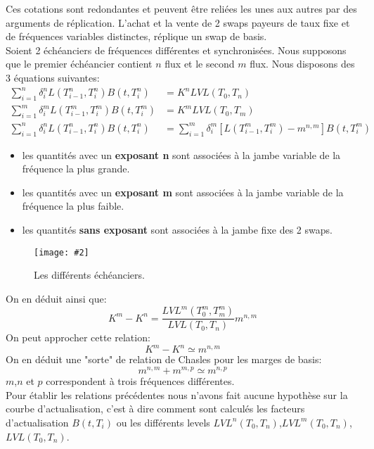 \documentclass{article}
\newcommand{\FIG}[2]{\texttt{[image: \#2]}}
\begin{document}
Ces cotations sont redondantes et peuvent être reliées les unes aux autres par des arguments de réplication. L'achat et la vente de 2 swaps payeurs de taux fixe et de fréquences variables distinctes, réplique un swap de basis.\\

Soient 2 échéanciers de fréquences différentes et synchronisées. Nous supposons que le premier échéancier contient $n$ flux et le second $m$ flux. Nous disposons des 3 équations suivantes:
\[
\begin{split}
\sum_{i=1}^{n} \delta^n_i L(T^n_{i-1},T^n_{i}) B(t,T^n_{i})&=K^n LVL(T_0,T_n)\\
\sum_{i=1}^{m} \delta^m_i L(T^m_{i-1},T^m_{i}) B(t,T^m_{i})&=K^m LVL(T_0,T_m)\\
\sum_{i=1}^{n} \delta^n_i L(T^n_{i-1},T^n_{i}) B(t,T^n_{i})&=\sum_{i=1}^{m} \delta^m_i [L(T^m_{i-1},T^m_{i})-m^{n,m}] B(t,T^m_{i})
\end{split}
\]
\begin{itemize}
\item les quantités avec un  \textbf{exposant n} sont associées à la jambe variable de la fréquence la plus grande.\\
\item les quantités avec un \textbf{exposant m} sont associées à la jambe variable de la fréquence la plus faible.\\
\item les quantités \textbf{sans exposant} sont associées à la jambe fixe des 2 swaps.\\
\end{itemize}

\begin{center}
\begin{figure}[h]
\vspace{2mm}
\FIG{15cm}{figures/basis.png} 
\vspace{1mm}
\caption{Les différents échéanciers.}
\end{figure}
\end{center}


On en déduit ainsi que:
\[
K^m-K^n=\frac{LVL^m(T^m_0,T^m_m)}{LVL(T_0,T_n)} m^{n,m}
\]
On peut approcher cette relation:
\[
K^m-K^n \simeq m^{n,m}
\]
On en déduit une "sorte" de relation de Chasles pour les marges de basis:
\[
m^{n,m}+m^{m,p} \simeq m^{n,p}
\]
$m$,$n$ et $p$ correspondent à trois fréquences différentes.\\

Pour établir les relations précédentes nous n'avons fait aucune hypothèse sur la courbe d'actualisation, c'est à dire comment sont calculés les facteurs d'actualisation $B(t,T_i)$ ou les différents levels $LVL^n(T_0,T_n)$,$LVL^m(T_0,T_n)$,$LVL(T_0,T_n)$.\\
\end{document}

